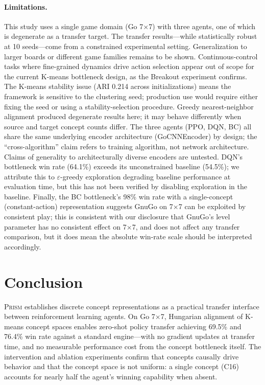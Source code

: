 \documentclass[11pt,a4paper]{article}
\newcommand{\prism}{\textsc{Prism}}
\begin{document}
\paragraph{Limitations.}
This study uses a single game domain (Go 7$\times$7) with three agents, one of which is degenerate as a transfer target. The transfer results---while statistically robust at 10 seeds---come from a constrained experimental setting. Generalization to larger boards or different game families remains to be shown. Continuous-control tasks where fine-grained dynamics drive action selection appear out of scope for the current K-means bottleneck design, as the Breakout experiment confirms. The K-means stability issue (ARI 0.214 across initializations) means the framework is sensitive to the clustering seed; production use would require either fixing the seed or using a stability-selection procedure. Greedy nearest-neighbor alignment produced degenerate results here; it may behave differently when source and target concept counts differ. The three agents (PPO, DQN, BC) all share the same underlying encoder architecture (GoCNNEncoder) by design; the ``cross-algorithm'' claim refers to training algorithm, not network architecture. Claims of generality to architecturally diverse encoders are untested. DQN's bottleneck win rate (64.1\%) exceeds its unconstrained baseline (54.5\%); we attribute this to $\varepsilon$-greedy exploration degrading baseline performance at evaluation time, but this has not been verified by disabling exploration in the baseline. Finally, the BC bottleneck's 98\% win rate with a single-concept (constant-action) representation suggests GnuGo on 7$\times$7 can be exploited by consistent play; this is consistent with our disclosure that GnuGo's level parameter has no consistent effect on 7$\times$7, and does not affect any transfer comparison, but it does mean the absolute win-rate scale should be interpreted accordingly.

\section{Conclusion}
\label{sec:conclusion}

\prism{} establishes discrete concept representations as a practical transfer interface between reinforcement learning agents. On Go 7$\times$7, Hungarian alignment of K-means concept spaces enables zero-shot policy transfer achieving 69.5\% and 76.4\% win rate against a standard engine---with no gradient updates at transfer time, and no measurable performance cost from the concept bottleneck itself. The intervention and ablation experiments confirm that concepts causally drive behavior and that the concept space is not uniform: a single concept (C16) accounts for nearly half the agent's winning capability when absent.
\end{document}
